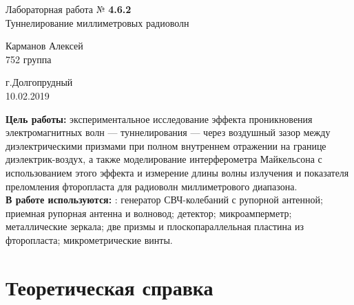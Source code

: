 \documentclass[12pt]{article}
\begin{document}
\begin{titlepage}
\begin{center}
\huge{Лабораторная работа № \textbf{4.6.2}}\\[1cm]\LARGE {Туннелирование миллиметровых радиоволн\\[7 cm]}
\end{center}

\begin{flushright}
\Large{Карманов Алексей\\752 группа}\\[9 cm]
\end{flushright}
\begin{center}
г.Долгопрудный\\
10.02.2019
\end{center}
\end{titlepage}
\fancyhead[L]
\indent \textbf{Цель работы:} экспериментальное исследование эффекта проникновения электромагнитных волн — туннелирования — через воздушный зазор между диэлектрическими призмами при полном внутреннем отражении на границе диэлектрик-воздух, а также моделирование интерферометра Майкельсона с использованием этого эффекта и измерение длины волны излучения и показателя преломления фторопласта для радиоволн миллиметрового диапазона.\\[0.75 cm]
\indent \textbf{В работе используются:} : генератор СВЧ-колебаний с рупорной антенной; приемная рупорная антенна и волновод; детектор; микроамперметр; металлические зеркала; две призмы и плоскопараллельная пластина из фторопласта; микрометрические винты.\\
\section{Теоретическая справка}
\end{document}

